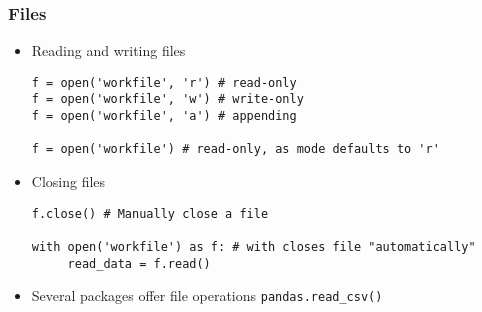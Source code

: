 \begin{frame}[fragile]
    \frametitle{Files}
    \begin{itemize}
        \item Reading and writing files
\begin{verbatim}
f = open('workfile', 'r') # read-only
f = open('workfile', 'w') # write-only
f = open('workfile', 'a') # appending

f = open('workfile') # read-only, as mode defaults to 'r'
\end{verbatim}
        \item Closing files
\begin{verbatim}
f.close() # Manually close a file

with open('workfile') as f: # with closes file "automatically"
     read_data = f.read()
\end{verbatim}
        \item Several packages offer file operations
        \texttt{pandas.read_csv()}
    \end{itemize}
\end{frame}

